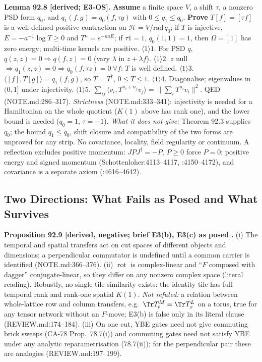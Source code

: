 \textbf{Lemma 92.8 [derived; E3-OS].}  \textbf{Assume} a finite space \(V\), a shift \(\tau\), a nonzero PSD form
\(q_0\), and \(q_1(f,g)=q_0(f,\tau g)\) with \(0\le q_1\le q_0\).  \textbf{Prove} \(T[f]=[\tau f]\) is a well-defined
positive contraction on \(\mathcal H=V/\mathrm{rad}\,q_0\); if \(T\) is injective, \(E=-a^{-1}\log T\ge0\) and
\(T^n=e^{-naE}\); if \(\tau1=1\), \(q_0(1,1)=1\), then \(\Omega=[1]\) has zero energy; multi-time kernels are positive.
\(\langle1\rangle1\). For PSD \(q\), \(q(z,z)=0\Rightarrow q(f,z)=0\) (vary \(\lambda\) in \(z+\lambda f\)).
\(\langle1\rangle2\). \(z\) null \(\Rightarrow q_1(z,z)=0\Rightarrow q_0(f,\tau z)=0\ \forall f\): \(T\) is well defined.
\(\langle1\rangle3\). \(\langle[f],T[g]\rangle=q_1(f,g)\), so \(T=T^\dagger\), \(0\le T\le1\).
\(\langle1\rangle4\). Diagonalise; eigenvalues in \((0,1]\) under injectivity.
\(\langle1\rangle5\). \(\sum_{ij}\langle v_i,T^{n_i+n_j}v_j\rangle=\|\sum_iT^{n_i}v_i\|^2\).  QED (NOTE.md:286--317).
\emph{Strictness} (NOTE.md:333--341): injectivity is needed for a Hamiltonian on the whole quotient (\(K(1)\) above has
rank one), and the lower bound is needed (\(q_0=1\), \(\tau=-1\)).  \emph{What it does not give:} Theorem 92.3 supplies
\(q_0\); the bound \(q_1\le q_0\), shift closure and compatibility of the two forms are unproved for any strip.  No
covariance, locality, field regularity or continuum.  A reflection excludes positive momentum: \(JPJ^\dagger=-P\),
\(P\ge0\) force \(P=0\); positive energy and signed momentum (Schottenloher:4113--4117, :4150--4172), and covariance is
a separate axiom (:4616--4642).

\subsection{Two Directions: What Fails as Posed and What Survives}

\textbf{Proposition 92.9 [derived, negative; brief E3(b), E3(c) as posed].}  (i) The temporal and spatial transfers
act on cut spaces of different objects and dimensions; a perpendicular commutator is undefined until a common
carrier is identified (NOTE.md:366--376).  (ii) \(\operatorname{rot}\) is complex-linear and ``\(F\) composed with
dagger'' conjugate-linear, so they differ on any nonzero complex space (literal reading).  Robustly, no single-tile
similarity exists: the identity tile has full temporal rank and rank-one spatial \(K(1)\).  \emph{Not refuted:} a
relation between whole-lattice row and column transfers, e.g.\ \(\Tr T_t^M=\Tr T_x^L\) on a torus, true for any
tensor network without an \(F\)-move; E3(b) is false only in its literal clause (REVIEW.md:174--184).  (iii) On one
cut, YBE gates need not give commuting brick sweeps (CA-78 Prop.~78.7(i)) and commuting gates need not satisfy YBE
under any analytic reparametrisation (78.7(ii)); for the perpendicular pair these are analogies (REVIEW.md:197--199).

